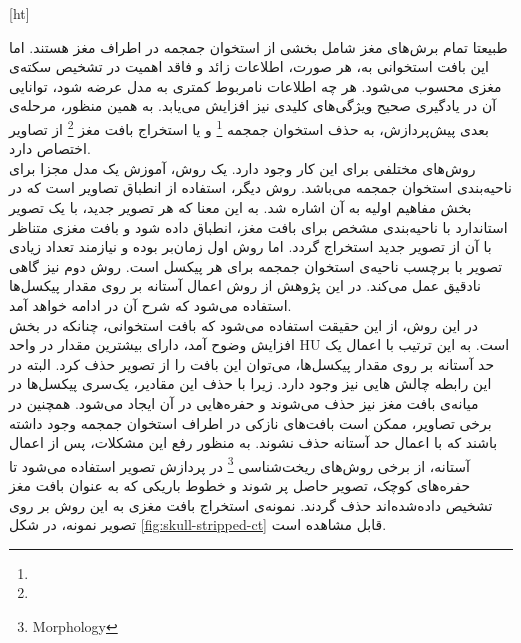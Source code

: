 
[ht]


طبیعتا تمام برش‌های مغز شامل بخشی از استخوان جمجمه در اطراف مغز هستند.
اما این بافت استخوانی به، هر صورت، اطلاعات زائد و فاقد اهمیت در تشخیص سکته‌ی مغزی محسوب می‌شود.
هر چه اطلاعات نامربوط کمتری به مدل عرضه شود، توانایی آن در یادگیری صحیح ویژگی‌های کلیدی نیز افزایش می‌یابد.
به همین منظور، مرحله‌ی بعدی پیش‌پردازش، به حذف استخوان جمجمه
\footnote{}
و یا استخراج بافت مغز
\footnote{}
از تصاویر اختصاص دارد.\\

روش‌های مختلفی برای این کار وجود دارد.
یک روش، آموزش یک مدل مجزا برای ناحیه‌بندی استخوان جمجمه می‌باشد.
روش دیگر، استفاده از انطباق تصاویر است که در بخش مفاهیم اولیه به آن اشاره شد.
به این معنا که هر تصویر جدید، با یک تصویر استاندارد با ناحیه‌بندی مشخص برای بافت مغز، انطباق داده شود و بافت مغزی متناظر با آن از تصویر جدید استخراج گردد.
اما روش اول زمان‌بر بوده و نیازمند تعداد زیادی تصویر با برچسب ناحیه‌ی استخوان جمجمه برای هر پیکسل است.
روش دوم نیز گاهی نادقیق عمل می‌کند.
در این پژوهش از روش اعمال آستانه بر روی مقدار پیکسل‌ها استفاده می‌شود که شرح آن در ادامه خواهد آمد.\\

در این روش، از این حقیقت استفاده می‌شود که بافت استخوانی، چنانکه در بخش افزایش وضوح آمد، دارای بیشترین مقدار در واحد HU است.
به این ترتیب با اعمال یک حد آستانه بر روی مقدار پیکسل‌ها، می‌‌توان این بافت را از تصویر حذف کرد.
البته در این رابطه چالش هایی نیز وجود دارد.
زیرا با حذف این مقادیر، یک‌سری پیکسل‌ها در میانه‌ی بافت مغز نیز حذف می‌شوند و حفره‌هایی در آن ایجاد می‌شود.
همچنین در برخی تصاویر، ممکن است بافت‌های نازکی در اطراف استخوان جمجمه وجود داشته باشند که با اعمال حد آستانه حذف نشوند.
به منظور رفع این مشکلات، پس از اعمال آستانه، از برخی روش‌های ریخت‌شناسی
\footnote{Morphology}
در پردازش تصویر استفاده می‌شود تا
حفره‌های کوچک، تصویر حاصل پر شوند و 
خطوط باریکی که به عنوان بافت مغز تشخیص داده‌شده‌اند حذف گردند.
نمونه‌ی استخراج بافت مغزی به این روش بر روی تصویر نمونه، در شکل \ref{fig:skull-stripped-ct}
قابل مشاهده است.

